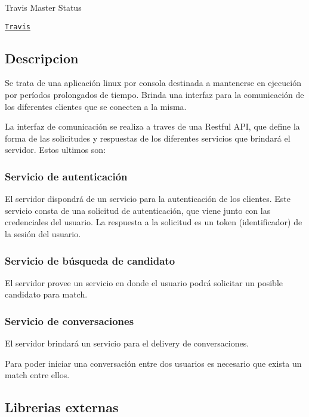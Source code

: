 Travis Master Status \href{https://travis-ci.org/seguijoaquin/taller2-appserver.svg?branch=master}{\tt }

\href{https://travis-ci.org/seguijoaquin/taller2-appserver}{\tt Travis}

\subsection*{Descripcion}

Se trata de una aplicación linux por consola destinada a mantenerse en ejecución por períodos prolongados de tiempo. Brinda una interfaz para la comunicación de los diferentes clientes que se conecten a la misma.

La interfaz de comunicación se realiza a traves de una Restful A\+PI, que define la forma de las solicitudes y respuestas de los diferentes servicios que brindará el servidor. Estos ultimos son\+:

\subsubsection*{Servicio de autenticación}

El servidor dispondrá de un servicio para la autenticación de los clientes. Este servicio consta de una solicitud de autenticación, que viene junto con las credenciales del usuario. La respuesta a la solicitud es un token (identificador) de la sesión del usuario.

\subsubsection*{Servicio de búsqueda de candidato}

El servidor provee un servicio en donde el usuario podrá solicitar un posible candidato para match.

\subsubsection*{Servicio de conversaciones}

El servidor brindará un servicio para el delivery de conversaciones.

Para poder iniciar una conversación entre dos usuarios es necesario que exista un match entre ellos.

\subsection*{Librerias externas}

